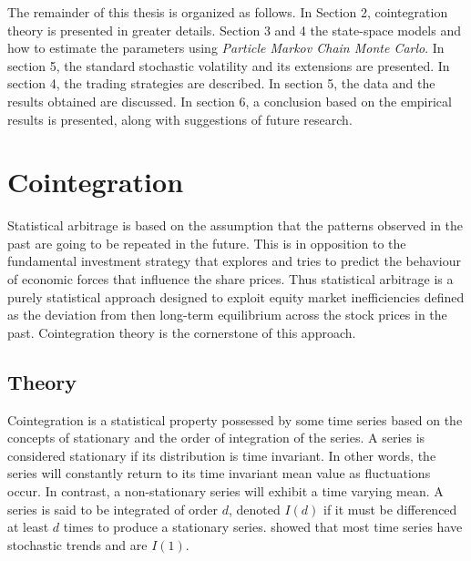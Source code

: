 \documentclass[11pt,a4,twosided,singlespacing,titlepagenumber=on]{scrreprt}
\numberwithin{equation}{chapter} %
\theoremstyle{remark}
\begin{document}
The remainder of this thesis is organized as follows. In Section 2, cointegration theory is presented in greater details. Section 3 and 4 the state-space models and how to estimate the parameters using \textit{Particle Markov Chain Monte Carlo}. In section 5, the standard stochastic volatility and its extensions are presented. In section 4, the trading strategies are described. In section 5, the data and the results obtained are discussed. In section 6, a conclusion based on the empirical results is presented, along with suggestions of future research.

\chapter{Cointegration}

Statistical arbitrage is based on the assumption that the patterns observed in the past are going to be repeated in the future. This is in opposition to the fundamental investment strategy that explores and tries to predict the behaviour of economic forces that influence the share prices. Thus statistical arbitrage is a purely statistical approach designed to exploit equity market inefficiencies defined as the deviation from then long-term equilibrium across the stock prices in the past. Cointegration theory is the cornerstone of this approach. 

\section{Theory}
Cointegration is a statistical property possessed by some time series based on the concepts of stationary and the order of integration of the series. A series is considered stationary if its distribution is time invariant. In other words, the series will constantly return to its time invariant mean value as fluctuations occur. In contrast, a non-stationary series will exhibit a time varying mean. A series is said to be integrated of order $d$, denoted $I(d)$ if it must be differenced at least $d$ times to produce a stationary series.
\cite{nelson1982} showed that most time series have stochastic trends and are $I(1)$. \\
\end{document}
